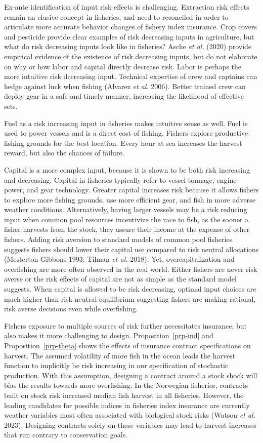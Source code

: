\documentclass[
  letterpaper,
  DIV=11,
  numbers=noendperiod]{scrartcl}
\theoremstyle{plain}
\theoremstyle{plain}
\theoremstyle{remark}
\begin{document}
Ex-ante identification of input risk effects is challenging. Extraction
risk effects remain an elusive concept in fisheries, and need to
reconciled in order to articulate more accurate behavior changes of
fishery index insurance. Crop covers and pesticide provide clear
examples of risk decreasing inputs in agriculture, but what do risk
decreasing inputs look like in fisheries? Asche \emph{et al.} (2020)
provide empirical evidence of the existence of risk decreasing inputs,
but do not elaborate on why or how labor and capital directly decrease
risk. Labor is perhaps the more intuitive risk decreasing input.
Technical expertise of crew and captains can hedge against luck when
fishing (Alvarez \emph{et al.} 2006). Better trained crew can deploy
gear in a safe and timely manner, increasing the likelihood of effective
sets.

Fuel as a risk increasing input in fisheries makes intuitive sense as
well. Fuel is used to power vessels and is a direct cost of fishing.
Fishers explore productive fishing grounds for the best location. Every
hour at sea increases the harvest reward, but also the chances of
failure.

Capital is a more complex input, because it is shown to be both risk
increasing and decreasing. Capital in fisheries typically refer to
vessel tonnage, engine power, and gear technology. Greater capital
increases risk because it allows fishers to explore more fishing
grounds, use more efficient gear, and fish in more adverse weather
conditions. Alternatively, having larger vessels may be a risk reducing
input when common pool resources incentivize the race to fish, as the
sooner a fisher harvests from the stock, they assure their income at the
expense of other fishers. Adding risk aversion to standard models of
common pool fisheries suggests fishers should lower their capital use
compared to risk neutral allocations (Mesterton-Gibbons 1993; Tilman
\emph{et al.} 2018). Yet, overcapitalization and overfishing are more
often observed in the real world. Either fishers are never risk averse
or the risk effects of capital are not as simple as the standard model
suggests. When capital is allowed to be risk decreasing, optimal input
choices are much higher than risk neutral equilibrium suggesting fishers
are making rational, risk averse decisions even while overfishing.

Fishers exposure to multiple sources of risk further necessitates
insurance, but also makes it more challenging to design.
Proposition~\ref{prp-ind} and Proposition~\ref{prp-theta} shows the
effects of insurance contract specifications on harvest. The assumed
volatility of more fish in the ocean leads the harvest function to
implicitly be risk increasing in our specification of stochastic
production. With this assumption, designing a contract around a stock
shock will bias the results towards more overfishing. In the Norwegian
fisheries, contracts built on stock risk increased median fish harvest
in all fisheries. However, the leading candidates for possible indices
in fisheries index insurance are currently weather variables most often
associated with biological stock risks (Watson \emph{et al.} 2023).
Designing contracts solely on these variables may lead to harvest
increases that run contrary to conservation goals.
\end{document}

